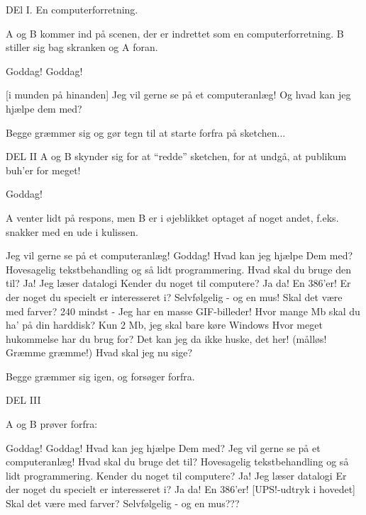 \documentclass[a4paper,11pt]{article}
\begin{document}
\begin{sketch}

\scene
DEl I. En computerforretning.

A og B kommer ind på scenen, der er indrettet som en
computerforretning. B stiller sig bag skranken og A foran.

 Goddag!
 Goddag!

[i munden på hinanden]
 Jeg vil gerne se på et computeranlæg!
 Og hvad kan jeg hjælpe dem med?

\scene
Begge græmmer sig og gør tegn til at starte forfra på sketchen...

\scene
DEL II
      A og B skynder sig for at ``redde'' sketchen, for at undgå, at
publikum buh'er for meget! 

  Goddag!

\scene
      A venter lidt på respons, men B er i øjeblikket optaget af
noget andet, f.eks. snakker med en ude i kulissen.

  Jeg vil gerne se på et computeranlæg!  
  Goddag! Hvad kan jeg hjælpe Dem med?  
  Hovesagelig tekstbehandling og så lidt programmering.
        Hvad skal du bruge den til?
        Ja! Jeg læser datalogi
        Kender du noget til computere?
        Ja da! En 386'er!
        Er der noget du specielt er interesseret i?
        Selvfølgelig - og en mus!
        Skal det være med farver?
        240 mindst - Jeg har en masse GIF-billeder!
        Hvor mange Mb skal du ha' på din harddisk?
        Kun 2 Mb, jeg skal bare køre Windows
        Hvor meget hukommelse har du brug for?
        Det kan jeg da ikke huske, det her!
        (målløs! Græmme græmme!) Hvad skal jeg nu sige?

\scene      Begge græmmer sig igen, og forsøger forfra.

\scene

DEL III

      A og B prøver forfra:

        Goddag!
        Goddag! Hvad kan jeg hjælpe Dem med?
        Jeg vil gerne se på et computeranlæg!
        Hvad skal du bruge det til?
        Hovesagelig tekstbehandling og så lidt programmering.
        Kender du noget til computere?
        Ja! Jeg læser datalogi
        Er der noget du specielt er interesseret i?
  Ja da! En 386'er! 
[UPS!-udtryk i hovedet]        Skal det være med farver?
        Selvfølgelig - og en mus???


\end{sketch}
\end{document}
